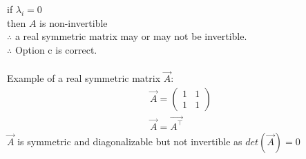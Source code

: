 \documentclass[journal]{IEEEtran}
\begin{document}
if $\lambda_i = 0$ \\
then $A$ is non-invertible \\

$\therefore$ a real symmetric matrix may or may not be invertible.\\
$\therefore$ Option c is correct.\\\\
Example of a real symmetric matrix $\vec{A}$:
\begin{align}
    \vec{A}=\begin{pmatrix}
        1 & 1\\1& 1
    \end{pmatrix}\\
    \vec{A}=\vec{A^\top}
\end{align}
$\vec{A}$ is symmetric and diagonalizable but not invertible as $det(\vec{A})=0$
\end{document}
